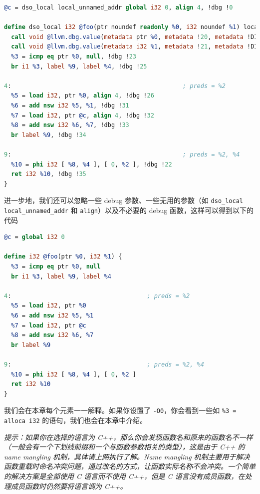 \begin{lstlisting}[language=llvm]
@c = dso_local local_unnamed_addr global i32 0, align 4, !dbg !0

define dso_local i32 @foo(ptr noundef readonly %0, i32 noundef %1) local_unnamed_addr #0 !dbg !15 {
  call void @llvm.dbg.value(metadata ptr %0, metadata !20, metadata !DIExpression()), !dbg !22
  call void @llvm.dbg.value(metadata i32 %1, metadata !21, metadata !DIExpression()), !dbg !22
  %3 = icmp eq ptr %0, null, !dbg !23
  br i1 %3, label %9, label %4, !dbg !25

4:                                                ; preds = %2
  %5 = load i32, ptr %0, align 4, !dbg !26
  %6 = add nsw i32 %5, %1, !dbg !31
  %7 = load i32, ptr @c, align 4, !dbg !32
  %8 = add nsw i32 %6, %7, !dbg !33
  br label %9, !dbg !34

9:                                                ; preds = %2, %4
  %10 = phi i32 [ %8, %4 ], [ 0, %2 ], !dbg !22
  ret i32 %10, !dbg !35
}
\end{lstlisting}

进一步地，我们还可以忽略一些 debug 参数、一些无用的参数（如
\texttt{dso\_local}   \texttt{local\_unnamed\_addr} 和
\texttt{align}）以及不必要的 debug 函数，这样可以得到以下的代码

\begin{lstlisting}[language=llvm]
@c = global i32 0

define i32 @foo(ptr %0, i32 %1) {
  %3 = icmp eq ptr %0, null
  br i1 %3, label %9, label %4

4:                                      ; preds = %2
  %5 = load i32, ptr %0
  %6 = add nsw i32 %5, %1
  %7 = load i32, ptr @c
  %8 = add nsw i32 %6, %7
  br label %9

9:                                      ; preds = %2, %4
  %10 = phi i32 [ %8, %4 ], [ 0, %2 ]
  ret i32 %10
}
\end{lstlisting}

我们会在本章每个元素一一解释。如果你设置了 \texttt{-O0}，你会看到一些如
\texttt{\%3 = alloca i32} 的语句，我们也会在本章中介绍。

\textit{提示：如果你在选择的语言为 C++，那么你会发现函数名和原来的函数名不一样（一般会有一个下划线前缀和一个与函数参数相关的类型），这是由于
C++ 的 name mangling 机制，具体请上网执行了解。Name mangling
 机制主要用于解决函数重载时命名冲突问题，通过改名的方式，让函数实际名称不会冲突。一个简单的解决方案是全部使用
 C 语言而不使用 C++，但是 C 语言没有成员函数，在处理成员函数时仍然要将语言调为 C++。}

